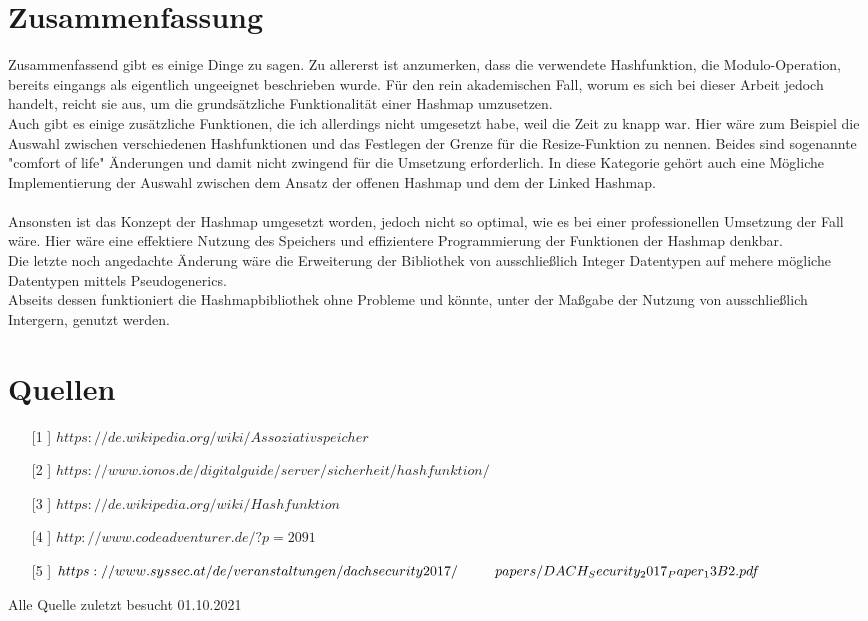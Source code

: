 \documentclass[11pt,a4paper]{article}
\begin{document}
\section{Zusammenfassung}
Zusammenfassend gibt es einige Dinge zu sagen. 
Zu allererst ist anzumerken, dass die verwendete Hashfunktion, die Modulo-Operation,
bereits eingangs als eigentlich ungeeignet beschrieben wurde. Für den rein akademischen Fall, worum es sich bei dieser Arbeit jedoch 
handelt, reicht sie aus, um die grundsätzliche Funktionalität einer Hashmap umzusetzen.\\
Auch gibt es einige zusätzliche Funktionen, die ich allerdings nicht umgesetzt habe, weil die Zeit zu knapp war.
Hier wäre zum Beispiel die Auswahl zwischen verschiedenen Hashfunktionen und das Festlegen der Grenze für die Resize-Funktion zu nennen.
Beides sind sogenannte "comfort of life" Änderungen und damit nicht zwingend für die Umsetzung erforderlich.
In diese Kategorie gehört auch eine Mögliche Implementierung der Auswahl zwischen dem Ansatz der offenen Hashmap und dem der Linked Hashmap.\\\\
Ansonsten ist das Konzept der Hashmap umgesetzt worden, jedoch nicht so optimal, wie es bei einer professionellen Umsetzung der Fall wäre.
Hier wäre eine effektiere Nutzung des Speichers und effizientere Programmierung der Funktionen der Hashmap denkbar.\\
Die letzte noch angedachte Änderung wäre die Erweiterung der Bibliothek von ausschließlich Integer Datentypen auf 
mehere mögliche Datentypen mittels Pseudogenerics.\\
Abseits dessen funktioniert die Hashmapbibliothek ohne Probleme und könnte, unter der Maßgabe der Nutzung von ausschließlich Intergern, genutzt werden.

\section{Quellen}
\begin{itemize}
\item[[1]] $https://de.wikipedia.org/wiki/Assoziativspeicher$
\item[[2]] $https://www.ionos.de/digitalguide/server/sicherheit/hashfunktion/$
\item[[3]] $https://de.wikipedia.org/wiki/Hashfunktion$
\item[[4]] $http://www.codeadventurer.de/?p=2091$
\item[[5]] $https://www.syssec.at/de/veranstaltungen/dachsecurity2017/ \\
            ~~~~~~~~papers/DACH_Security_2017_Paper_13B2.pdf$
\end{itemize}
\centering 
Alle Quelle zuletzt besucht 01.10.2021
\end{document}
